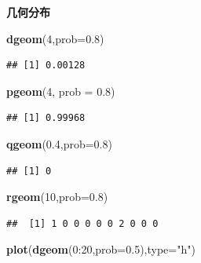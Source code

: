 \documentclass[]{article}
\newenvironment{Shaded}{\begin{snugshade}}{\end{snugshade}}
\newcommand{\KeywordTok}[1]{\textcolor[rgb]{0.13,0.29,0.53}{\textbf{{#1}}}}
\newcommand{\DataTypeTok}[1]{\textcolor[rgb]{0.13,0.29,0.53}{{#1}}}
\newcommand{\DecValTok}[1]{\textcolor[rgb]{0.00,0.00,0.81}{{#1}}}
\newcommand{\FloatTok}[1]{\textcolor[rgb]{0.00,0.00,0.81}{{#1}}}
\newcommand{\StringTok}[1]{\textcolor[rgb]{0.31,0.60,0.02}{{#1}}}
\newcommand{\NormalTok}[1]{{#1}}
\begin{document}
\textbf{几何分布}

\begin{Shaded}
\begin{Highlighting}[]
\KeywordTok{dgeom}\NormalTok{(}\DecValTok{4}\NormalTok{,}\DataTypeTok{prob=}\FloatTok{0.8}\NormalTok{)}
\end{Highlighting}
\end{Shaded}

\begin{verbatim}
## [1] 0.00128
\end{verbatim}

\begin{Shaded}
\begin{Highlighting}[]
\KeywordTok{pgeom}\NormalTok{(}\DecValTok{4}\NormalTok{, }\DataTypeTok{prob =} \FloatTok{0.8}\NormalTok{)}
\end{Highlighting}
\end{Shaded}

\begin{verbatim}
## [1] 0.99968
\end{verbatim}

\begin{Shaded}
\begin{Highlighting}[]
\KeywordTok{qgeom}\NormalTok{(}\FloatTok{0.4}\NormalTok{,}\DataTypeTok{prob=}\FloatTok{0.8}\NormalTok{)}
\end{Highlighting}
\end{Shaded}

\begin{verbatim}
## [1] 0
\end{verbatim}

\begin{Shaded}
\begin{Highlighting}[]
\KeywordTok{rgeom}\NormalTok{(}\DecValTok{10}\NormalTok{,}\DataTypeTok{prob=}\FloatTok{0.8}\NormalTok{)}
\end{Highlighting}
\end{Shaded}

\begin{verbatim}
##  [1] 1 0 0 0 0 0 2 0 0 0
\end{verbatim}

\begin{Shaded}
\begin{Highlighting}[]
\KeywordTok{plot}\NormalTok{(}\KeywordTok{dgeom}\NormalTok{(}\DecValTok{0}\NormalTok{:}\DecValTok{20}\NormalTok{,}\DataTypeTok{prob=}\FloatTok{0.5}\NormalTok{),}\DataTypeTok{type=}\StringTok{"h"}\NormalTok{)}
\end{Highlighting}
\end{Shaded}
\end{document}
